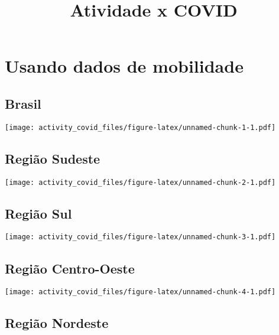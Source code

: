 \documentclass[
]{article}
\title{Atividade x COVID}
\author{}
\date{\vspace{-2.5em}}
\begin{document}
\maketitle

\hypertarget{usando-dados-de-mobilidade}{%
\section{Usando dados de mobilidade}\label{usando-dados-de-mobilidade}}

\hypertarget{brasil}{%
\subsection{Brasil}\label{brasil}}

\texttt{[image: activity\_covid\_files/figure-latex/unnamed-chunk-1-1.pdf]}

\pagebreak

\hypertarget{regiuxe3o-sudeste}{%
\subsection{Região Sudeste}\label{regiuxe3o-sudeste}}

\texttt{[image: activity\_covid\_files/figure-latex/unnamed-chunk-2-1.pdf]}

\pagebreak

\hypertarget{regiuxe3o-sul}{%
\subsection{Região Sul}\label{regiuxe3o-sul}}

\texttt{[image: activity\_covid\_files/figure-latex/unnamed-chunk-3-1.pdf]}

\pagebreak

\hypertarget{regiuxe3o-centro-oeste}{%
\subsection{Região Centro-Oeste}\label{regiuxe3o-centro-oeste}}

\texttt{[image: activity\_covid\_files/figure-latex/unnamed-chunk-4-1.pdf]}

\pagebreak

\hypertarget{regiuxe3o-nordeste}{%
\subsection{Região Nordeste}\label{regiuxe3o-nordeste}}
\end{document}
